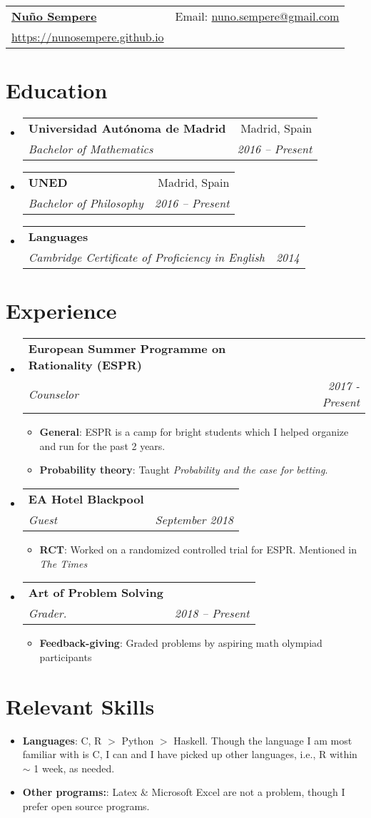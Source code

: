 \documentclass[letterpaper,11pt]{article}
\makeatletter
\newcommand{\resumeItem}[2]{
  \item\small{
    \textbf{#1}{: #2 \vspace{-2pt}}
  }
}
\newcommand{\resumeSubheading}[4]{
  \vspace{-1pt}\item
    \begin{tabular*}{0.97\textwidth}[t]{l@{\extracolsep{\fill}}r}
      \textbf{#1} & #2 \\
      \textit{\small#3} & \textit{\small #4} \\
    \end{tabular*}\vspace{-5pt}
}
\newcommand{\resumeSubItem}[2]{\resumeItem{#1}{#2}\vspace{-4pt}}
\newcommand{\resumeSubHeadingListStart}{\begin{itemize}[leftmargin=*]}
\newcommand{\resumeSubHeadingListEnd}{\end{itemize}}
\newcommand{\resumeItemListStart}{\begin{itemize}}
\newcommand{\resumeItemListEnd}{\end{itemize}\vspace{-5pt}}
\makeatother
\begin{document}
\begin{tabular*}{\textwidth}{l@{\extracolsep{\fill}}r}
  \textbf{\href{https://nunosempere.github.io}{\Large Nu\~{n}o Sempere}} & Email: \href{mailto:nuno.sempere@gmail.com}{nuno.sempere@gmail.com}\\
  \href{https://nunosempere.github.io}{https://nunosempere.github.io}\\
\end{tabular*}


\section{Education}
  \resumeSubHeadingListStart
    \resumeSubheading
      {Universidad Aut\'onoma de Madrid}{Madrid, Spain}
      {Bachelor of Mathematics}{2016 -- Present}
    \resumeSubheading
      {UNED}{Madrid, Spain}
      {Bachelor of Philosophy}{2016 -- Present}
    \resumeSubheading
      {Languages}{ }
      {Cambridge Certificate of Proficiency in English}{2014}

  \resumeSubHeadingListEnd


\section{Experience}
  \resumeSubHeadingListStart

    \resumeSubheading
      {European Summer Programme on Rationality (ESPR)}{}
      {Counselor}{2017 - Present}
      \resumeItemListStart
        \resumeItem{General}
          {ESPR is a camp for bright students which I helped organize and run for the past 2 years.}
        \resumeItem{Probability theory}
          {Taught  \textit{Probability and the case for betting}.}
      
      \resumeItemListEnd
    \resumeSubheading
      {EA Hotel Blackpool}{ }
      {Guest}{September 2018}
      \resumeItemListStart
        \resumeItem{RCT}
          {Worked on a randomized controlled trial for ESPR. Mentioned in \textit{The Times}}
      \resumeItemListEnd
    \resumeSubheading
      {Art of Problem Solving}{ }
      {Grader.}{2018 -- Present}
      \resumeItemListStart
              \resumeItem{Feedback-giving}
          {Graded problems by aspiring math olympiad participants}
      \resumeItemListEnd

      
  \resumeSubHeadingListEnd


\section{Relevant Skills}
  \resumeSubHeadingListStart
   \resumeSubItem{Languages}{C, R $>$ Python $>$ Haskell. Though the language I am most familiar with is C, I can and I have picked up other languages, i.e., R within $\sim$ 1 week, as needed.}
   \resumeSubItem{Other programs:}{Latex \& Microsoft Excel are not a problem, though I prefer open source programs.}
  \resumeSubHeadingListEnd


\end{document}
